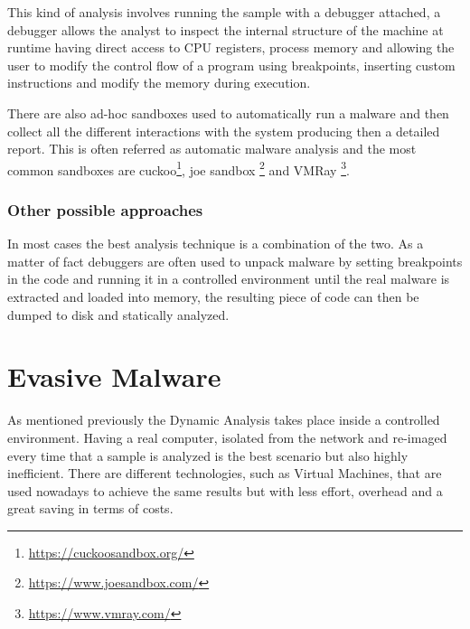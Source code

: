 This kind of analysis involves running the sample with a debugger attached, a debugger allows the analyst to inspect the internal structure of the machine at runtime having direct access to CPU registers, process memory and allowing the user to modify the control flow of a program using breakpoints, inserting custom instructions and modify the memory during execution. 

There are also ad-hoc sandboxes used to automatically run a malware and then collect all the different interactions with the system producing then a detailed report. This is often referred as automatic malware analysis and the most common sandboxes are cuckoo\footnote{\url{https://cuckoosandbox.org/}}, joe sandbox \footnote{\url{https://www.joesandbox.com/}} and VMRay \footnote{\url{https://www.vmray.com/}}. 
\subsubsection{Other possible approaches}



In most cases the best analysis technique is a combination of the two. As a matter of fact debuggers are often used to unpack malware by setting breakpoints in the code and running it in a controlled environment until the real malware is extracted and loaded into memory, the resulting piece of code can then be dumped to disk and statically analyzed. 

\section{Evasive Malware}
\label{sec:evmal}

As mentioned previously the Dynamic Analysis takes place inside a controlled environment. Having a real computer, isolated from the network and re-imaged every time that a sample is analyzed is the best scenario but also highly inefficient. There are different technologies, such as Virtual Machines, that are used nowadays to achieve the same results but with less effort, overhead and a great saving in terms of costs. 

